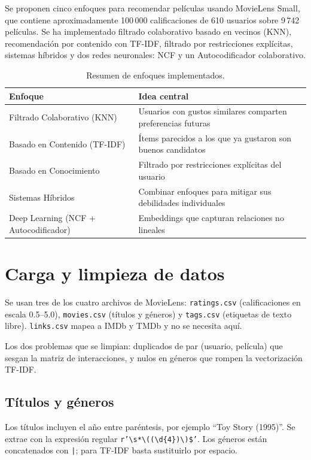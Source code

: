 Se proponen cinco enfoques para recomendar películas usando MovieLens Small, que contiene aproximadamente 100\,000 calificaciones de 610 usuarios sobre 9\,742 películas. Se ha implementado filtrado colaborativo basado en vecinos (KNN), recomendación por contenido con TF-IDF, filtrado por restricciones explícitas, sistemas híbridos y dos redes neuronales: NCF y un Autocodificador colaborativo.

\begin{table}[h]
\centering
\begin{tabular}{lp{8cm}}
\toprule
Enfoque & Idea central \\
\midrule
Filtrado Colaborativo (KNN)           & Usuarios con gustos similares comparten preferencias futuras \\
Basado en Contenido (TF-IDF)          & Ítems parecidos a los que ya gustaron son buenos candidatos \\
Basado en Conocimiento                & Filtrado por restricciones explícitas del usuario \\
Sistemas Híbridos                     & Combinar enfoques para mitigar sus debilidades individuales \\
Deep Learning (NCF + Autocodificador) & Embeddings que capturan relaciones no lineales \\
\bottomrule
\end{tabular}
\caption{Resumen de enfoques implementados.}
\end{table}

\section{Carga y limpieza de datos}

Se usan tres de los cuatro archivos de MovieLens: \texttt{ratings.csv} (calificaciones en escala 0.5--5.0), \texttt{movies.csv} (títulos y géneros) y \texttt{tags.csv} (etiquetas de texto libre). \texttt{links.csv} mapea a IMDb y TMDb y no se necesita aquí.

Los dos problemas que se limpian: duplicados de par (usuario, película) que sesgan la matriz de interacciones, y nulos en géneros que rompen la vectorización TF-IDF.

\subsection{Títulos y géneros}

Los títulos incluyen el año entre paréntesis, por ejemplo ``Toy Story (1995)''. Se extrae con la expresión regular \texttt{r'\textbackslash s*\textbackslash((\textbackslash d\{4\})\textbackslash)\$'}. Los géneros están concatenados con \texttt{|}; para TF-IDF basta sustituirlo por espacio.


